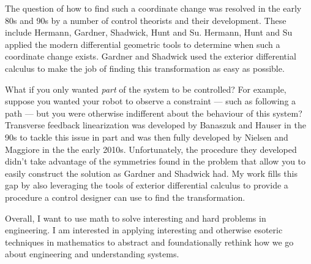 The question of how to find such a coordinate change was resolved in the early 80s and 90s by a number of control theorists and their development.
These include Hermann, Gardner, Shadwick, Hunt and Su.
Hermann, Hunt and Su applied the modern differential geometric tools to determine when such a coordinate change exists.
Gardner and Shadwick used the exterior differential calculus to make the job of finding this transformation as easy as possible.

What if you only wanted \emph{part} of the system to be controlled?
For example, suppose you wanted your robot to observe a constraint --- such as following a path --- but you were otherwise indifferent about the behaviour of this system?
Transverse feedback linearization was developed by Banaszuk and Hauser in the 90s to tackle this issue in part and was then fully developed by Nielsen and Maggiore in the the early 2010s.
Unfortunately, the procedure they developed didn't take advantage of the symmetries found in the problem that allow you to easily construct the solution as Gardner and Shadwick had.
My work fills this gap by also leveraging the tools of exterior differential calculus to provide a procedure a control designer can use to find the transformation.

Overall, I want to use math to solve interesting and hard problems in engineering.
I am interested in applying interesting and otherwise esoteric techniques in mathematics to abstract and foundationally rethink how we go about engineering and understanding systems.